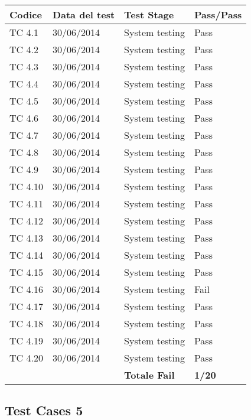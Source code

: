 \begin{tabular}{|p{3cm}|p{3cm}|p{3cm}|p{3cm}|}
	\hline
	\rowcolor{Gray}
	\textbf{Codice} & \textbf{Data del test} & \textbf{Test Stage} & \textbf{Pass/Pass}\tabularnewline
	\hline
	TC 4.1			& 30/06/2014 			& System testing		& Pass \tabularnewline
	\hline
	TC 4.2			& 30/06/2014 			& System testing		& Pass \tabularnewline
	\hline
	TC 4.3			& 30/06/2014 			& System testing		& Pass \tabularnewline
	\hline
	TC 4.4			& 30/06/2014 			& System testing		& Pass \tabularnewline
	\hline
	TC 4.5			& 30/06/2014 			& System testing		& Pass \tabularnewline
	\hline
	TC 4.6			& 30/06/2014 			& System testing		& Pass \tabularnewline
	\hline
	TC 4.7			& 30/06/2014 			& System testing		& Pass \tabularnewline
	\hline
	TC 4.8			& 30/06/2014 			& System testing		& Pass \tabularnewline
	\hline
	TC 4.9			& 30/06/2014 			& System testing		& Pass \tabularnewline
	\hline
	TC 4.10			& 30/06/2014 			& System testing		& Pass \tabularnewline
	\hline
	TC 4.11			& 30/06/2014 			& System testing		& Pass \tabularnewline
	\hline
	TC 4.12			& 30/06/2014 			& System testing		& Pass \tabularnewline
	\hline
	TC 4.13			& 30/06/2014 			& System testing		& Pass \tabularnewline
	\hline
	TC 4.14			& 30/06/2014 			& System testing		& Pass \tabularnewline
	\hline
	TC 4.15			& 30/06/2014 			& System testing		& Pass \tabularnewline
	\hline
	TC 4.16			& 30/06/2014 			& System testing		& Fail \tabularnewline
	\hline
	TC 4.17			& 30/06/2014 			& System testing		& Pass \tabularnewline
	\hline
	TC 4.18			& 30/06/2014 			& System testing		& Pass \tabularnewline
	\hline
	TC 4.19			& 30/06/2014 			& System testing		& Pass \tabularnewline
	\hline
	TC 4.20			& 30/06/2014 			& System testing		& Pass \tabularnewline
	\hline
					& 						& \textbf{Totale Fail}	& \textbf{1/20} \tabularnewline
	\hline
\end{tabular}

\subsection{Test Cases 5}

